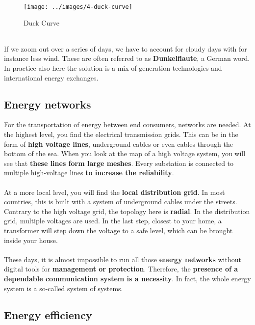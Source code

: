 \documentclass[../summary.tex]{subfiles}
\begin{document}
	\begin{figure}[H]
		\centering
		\texttt{[image: ../images/4-duck-curve]}
		\caption{Duck Curve}
		\label{fig:duck-curve}
	\end{figure}
	
	\ \\
	If we zoom out over a series of days, we have to account for cloudy days with for instance less wind. These are often referred to as \textbf{Dunkelflaute}, a German word. In practice also here the solution is a mix of generation technologies and international energy exchanges.
	
	\subsection{Energy networks}
	
	For the transportation of energy between end consumers, networks are needed. At the highest level, you find the electrical transmission grids. This can be in the form of \textbf{high voltage lines}, underground cables or even cables through the bottom of the sea. When you look at the map of a high voltage system, you will see that \textbf{these lines form large meshes}. Every substation is connected to multiple high-voltage lines \textbf{to increase the reliability}. 
	\\\\
	At a more local level, you will find the \textbf{local distribution grid}. In most countries, this is built with a system of underground cables under the streets. Contrary to the high voltage grid, the topology here is \textbf{radial}. In the distribution grid, multiple voltages are used. In the last step, closest to your home, a transformer will step down the voltage to a safe level, which can be brought inside your house. 
	\\\\
	These days, it is almost impossible to run all those \textbf{energy networks} without digital tools for \textbf{management or protection}. Therefore, the \textbf{presence of a dependable communication system is a necessity}. In fact, the whole energy system is a so-called system of systems.
	
	\subsection{Energy efficiency}
	
\end{document}
